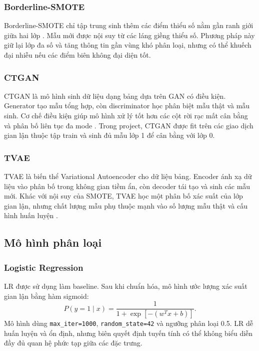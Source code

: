 \documentclass[12pt,a4paper]{article}
\begin{document}
\subsubsection{Borderline-SMOTE}

Borderline-SMOTE chỉ tập trung sinh thêm các điểm thiểu số nằm gần ranh giới giữa hai lớp \cite{han2005}. Mẫu mới được nội suy từ các láng giềng thiểu số. Phương pháp này giữ lại lớp đa số và tăng thông tin gần vùng khó phân loại, nhưng có thể khuếch đại nhiễu nếu các điểm biên không đại diện tốt.

\subsubsection{CTGAN}

CTGAN là mô hình sinh dữ liệu dạng bảng dựa trên GAN có điều kiện. Generator tạo mẫu tổng hợp, còn discriminator học phân biệt mẫu thật và mẫu sinh. Cơ chế điều kiện giúp mô hình xử lý tốt hơn các cột rời rạc mất cân bằng và phân bố liên tục đa mode \cite{xu2019}. Trong project, CTGAN được fit trên các giao dịch gian lận thuộc tập train và sinh đủ mẫu lớp 1 để cân bằng với lớp 0.

\subsubsection{TVAE}

TVAE là biến thể Variational Autoencoder cho dữ liệu bảng. Encoder ánh xạ dữ liệu vào phân bố trong không gian tiềm ẩn, còn decoder tái tạo và sinh các mẫu mới. Khác với nội suy của SMOTE, TVAE học một phân bố xác suất của lớp gian lận, nhưng chất lượng mẫu phụ thuộc mạnh vào số lượng mẫu thật và cấu hình huấn luyện \cite{xu2019}.

\subsection{Mô hình phân loại}

\subsubsection{Logistic Regression}

LR được sử dụng làm baseline. Sau khi chuẩn hóa, mô hình ước lượng xác suất gian lận bằng hàm sigmoid:
\begin{equation}
    P(y=1\mid x)=\frac{1}{1+\exp[-(w^Tx+b)]}.
\end{equation}
Mô hình dùng \texttt{max\_iter=1000}, \texttt{random\_state=42} và ngưỡng phân loại 0.5. LR dễ huấn luyện và ổn định, nhưng biên quyết định tuyến tính có thể không biểu diễn đầy đủ quan hệ phức tạp giữa các đặc trưng.
\end{document}

